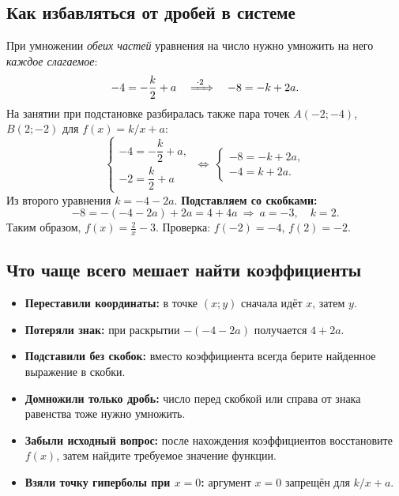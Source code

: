 \documentclass[a4paper,12pt]{article}
\begin{document}
\subsection*{Как избавляться от дробей в системе}
При умножении \emph{обеих частей} уравнения на число нужно умножить на него \emph{каждое слагаемое}:
\[
-4=-\frac{k}{2}+a
\quad\xRightarrow{\ \cdot2\ }\quad -8=-k+2a.
\]
На занятии при подстановке разбиралась также пара точек \(A(-2;-4)\), \(B(2;-2)\) для \(f(x)=k/x+a\):
\[
\begin{cases}-4=-\dfrac{k}{2}+a,\\[1mm]-2=\dfrac{k}{2}+a\end{cases}
\ \Longleftrightarrow\
\begin{cases}-8=-k+2a,\\-4=k+2a.\end{cases}
\]
Из второго уравнения \(k=-4-2a\). \textbf{Подставляем со скобками:}
\[
-8=-(-4-2a)+2a=4+4a
\ \Longrightarrow\ a=-3,\quad k=2.
\]
Таким образом, \(\displaystyle f(x)=\frac2x-3\). Проверка: \(f(-2)=-4\), \(f(2)=-2\).

\subsection*{Что чаще всего мешает найти коэффициенты}
\begin{itemize}
\item \textbf{Переставили координаты:} в точке \((x;y)\) сначала идёт \(x\), затем \(y\).
\item \textbf{Потеряли знак:} при раскрытии \(-(-4-2a)\) получается \(4+2a\).
\item \textbf{Подставили без скобок:} вместо коэффициента всегда берите найденное выражение в скобки.
\item \textbf{Домножили только дробь:} число перед скобкой или справа от знака равенства тоже нужно умножить.
\item \textbf{Забыли исходный вопрос:} после нахождения коэффициентов восстановите \(f(x)\), затем найдите требуемое значение функции.
\item \textbf{Взяли точку гиперболы при \(x=0\):} аргумент \(x=0\) запрещён для \(k/x+a\).
\end{itemize}
\clearpage
\end{document}
